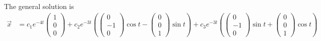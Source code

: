 \begin{parts}
    \ifnum {} {\color{DarkBlue} 
The general solution is
\begin{align}
    \vec x &= 
    c_1 e^{-4t}\begin{pmatrix} 1\\0\\0\end{pmatrix}
    + c_2 e^{-3t} \left( \begin{pmatrix} 0\\-1\\0\end{pmatrix} \cos t - \begin{pmatrix} 0\\0\\1 \end{pmatrix} \sin t \right)
    + c_3 e^{-3t} \left( \begin{pmatrix} 0\\-1\\0\end{pmatrix} \sin t + \begin{pmatrix} 0\\0\\1 \end{pmatrix} \cos t \right)
\end{align}
} 
\else 
\vspace{3cm}
\fi
\end{parts}

\fi